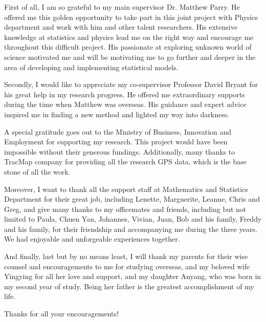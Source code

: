 First of all, I am so grateful to my main supervisor Dr. Matthew Parry. He offered me this golden opportunity to take part in this joint project with Physics department and work with him and other talent researchers. His extensive knowledge at statistics and physics lead me on the right way and encourage me throughout this difficult project. His passionate at exploring unknown world of science motivated me and will be motivating me to go further and deeper in the area of developing and implementing statistical models.  

Secondly, I would like to appreciate my co-supervisor Professor David Bryant for his great help in my research progress. He offered me extraordinary supports during the time when Matthew was overseas. His guidance and expert advice inspired me in finding a new method and lighted my way into darkness. 

A special gratitude goes out to the Ministry of Business, Innovation and Employment for supporting my research. This project would have been impossible without their generous fundings. Additionally, many thanks to TracMap company for providing all the research GPS data, which is the base stone of all the work. 

Moreover, I want to thank all the support staff at Mathematics and Statistics Department for their great job, including Lenette, Marguerite, Leanne, Chris and Greg, and give many thanks to my officemates and friends, including but not limited to Paula, Chuen Yan, Johannes, Vivian, Juan, Bob and his family, Freddy and his family, for their friendship and accompanying me during the three years. We had enjoyable and unforgeable experiences together. 

And finally, last but by no means least, I will thank my parents for their wise counsel and encouragements to me for studying overseas, and my beloved wife Yingying for all her love and support, and my daughter Anyang, who was born in my second year of study. Being her father is the greatest accomplishment of my life.

Thanks for all your encouragements! 

